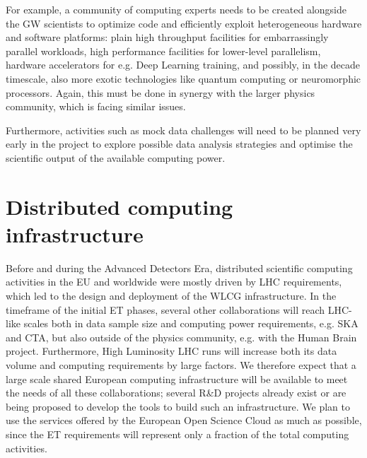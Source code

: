 For example, a community of computing experts needs to be created alongside the GW scientists to optimize code and efficiently exploit heterogeneous hardware and software platforms: plain high throughput facilities for embarrassingly parallel workloads, high performance facilities for lower-level parallelism, hardware accelerators for e.g. Deep Learning training, and possibly, in the decade timescale, also more exotic technologies like quantum computing or neuromorphic processors. Again, this must be done in synergy with the larger physics community, which is facing similar issues.

Furthermore, activities such as mock data challenges will need to be planned very early in the project to explore possible data analysis strategies and optimise the scientific output of the available computing power. 

\section[Distributed computing infrastructure]{Distributed computing infrastructure}
\label{sec:Distributed computing infrastructure}
Before and during the Advanced Detectors Era, distributed scientific computing activities in the EU and worldwide were mostly driven by LHC requirements, which led to the design and deployment of the WLCG infrastructure.
In the timeframe of the initial ET phases, several other collaborations will reach LHC-like scales both in data sample size and computing power requirements, e.g. SKA and CTA, but also outside of the physics community, e.g. with the Human Brain project. Furthermore, High Luminosity LHC runs will increase both its data volume and computing requirements by large factors.
We therefore expect that a large scale shared European computing infrastructure will be available to meet the needs of all these collaborations; several R\&D projects already exist or are being proposed to develop the tools to build such an infrastructure. We plan to use the services offered by the European Open Science Cloud as much as possible, since the ET requirements will represent only a fraction of the total computing activities.

